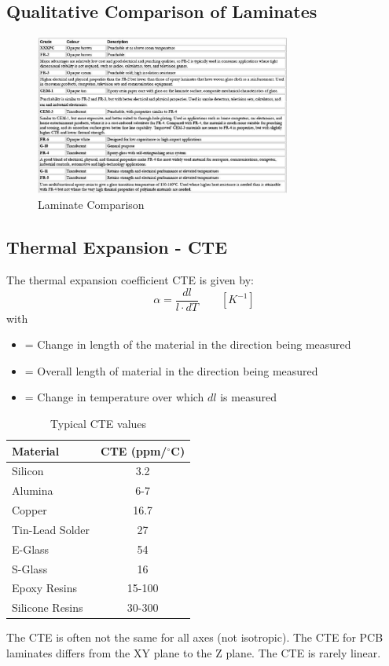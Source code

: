 	\subsection{Qualitative Comparison of Laminates}	
		\begin{figure}[h]
			\centering
			\includegraphics[width=0.75\textwidth]{images/LaminateComparison.png}
			\caption{Laminate Comparison}
			\label{Fig:LaminateComparison}
		\end{figure}		
			
	\subsection{Thermal Expansion - CTE}
		The thermal expansion coefficient CTE is given by: 
		\begin{equation}
			\alpha = \frac{dl}{l\cdot dT} \qquad[K^{-1}]
		\end{equation}
		with 
		\begin{itemize}
			\setlength{\itemsep}{-5pt}
			\item[]  = Change in length of the material in the direction being measured
			\item[]  = Overall length of material in the direction being measured
			\item[]  = Change in temperature over which $dl$ is measured
		\end{itemize}
		
		\begin{table}[h!]
			\centering
			\begin{tabular}{|l|c|}
				\hline
					\textbf{Material} & \textbf{CTE (ppm/$^\circ$C)}\\
				\hline
				\hline
					Silicon & 3.2 \\
				\hline
					Alumina & 6-7 \\
				\hline
					Copper & 16.7\\
				\hline
					Tin-Lead Solder & 27 \\
				\hline
					E-Glass & 54 \\
				\hline
					S-Glass & 16 \\
				\hline
					Epoxy Resins & 15-100 \\
				\hline	
					Silicone Resins & 30-300\\	
				 \hline
			\end{tabular}
			\caption{Typical CTE values}
			\label{Tab:CTEValues}
		\end{table}
		The CTE is often not the same for all axes (not isotropic). The CTE for PCB laminates differs from the XY plane to the Z plane. The CTE is rarely linear. 
